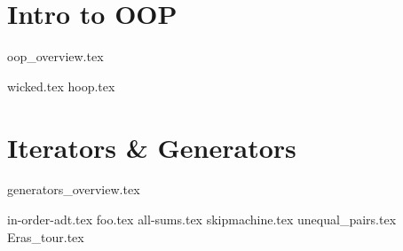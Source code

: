 \documentclass{exam}
\begin{document}
\section{Intro to OOP}
{oop_overview.tex}
\begin{questions}
    {wicked.tex}
    {hoop.tex}
\end{questions}

\newpage
\section{Iterators \& Generators}
{generators_overview.tex}
\begin{questions}
    {in-order-adt.tex}
    \newpage
    {foo.tex}
    {all-sums.tex}
       \newpage
    {skipmachine.tex}
     {unequal_pairs.tex}
      {Eras_tour.tex}

     
\end{questions}
\end{document}
